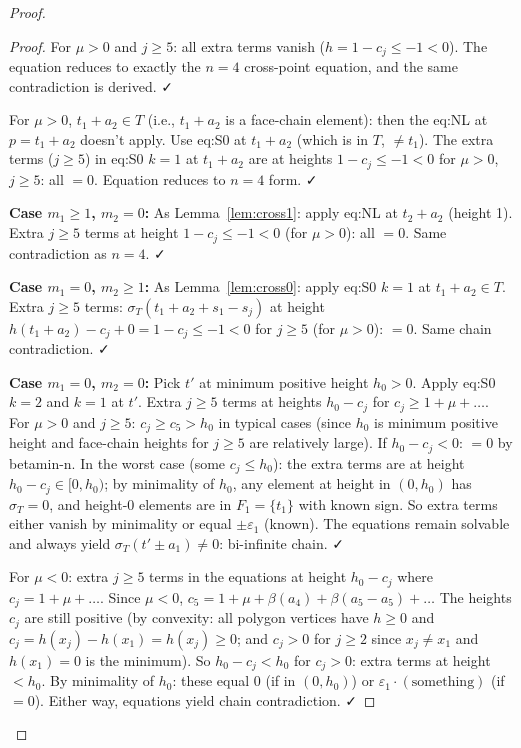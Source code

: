 \begin{proof}
\begin{proof}
For $\mu>0$ and $j\geq 5$: all extra terms vanish ($h=1-c_j\leq -1<0$). The equation reduces to exactly the $n=4$ cross-point equation, and the same contradiction is derived. ✓

For $\mu>0$, $t_1+a_2\in T$ (i.e., $t_1+a_2$ is a face-chain element): then the eq:NL at $p=t_1+a_2$ doesn't apply. Use eq:S0 at $t_1+a_2$ (which is in $T$, $\neq t_1$). The extra terms ($j\geq 5$) in eq:S0 $k=1$ at $t_1+a_2$ are at heights $1-c_j\leq -1<0$ for $\mu>0$, $j\geq 5$: all $=0$. Equation reduces to $n=4$ form. ✓

\textbf{Case $m_1\geq 1$, $m_2=0$:} As Lemma~\ref{lem:cross1}: apply eq:NL at $t_2+a_2$ (height 1). Extra $j\geq 5$ terms at height $1-c_j\leq -1<0$ (for $\mu>0$): all $=0$. Same contradiction as $n=4$. ✓

\textbf{Case $m_1=0$, $m_2\geq 1$:} As Lemma~\ref{lem:cross0}: apply eq:S0 $k=1$ at $t_1+a_2\in T$. Extra $j\geq 5$ terms: $\sigma_T(t_1+a_2+s_1-s_j)$ at height $h(t_1+a_2)-c_j+0 = 1-c_j\leq -1<0$ for $j\geq 5$ (for $\mu>0$): $=0$. Same chain contradiction. ✓

\textbf{Case $m_1=0$, $m_2=0$:} Pick $t'$ at minimum positive height $h_0>0$. Apply eq:S0 $k=2$ and $k=1$ at $t'$. Extra $j\geq 5$ terms at heights $h_0-c_j$ for $c_j\geq 1+\mu+\ldots$. For $\mu>0$ and $j\geq 5$: $c_j\geq c_5>h_0$ in typical cases (since $h_0$ is minimum positive height and face-chain heights for $j\geq 5$ are relatively large). If $h_0-c_j<0$: $=0$ by betamin-n. In the worst case (some $c_j\leq h_0$): the extra terms are at height $h_0-c_j\in[0,h_0)$; by minimality of $h_0$, any element at height in $(0,h_0)$ has $\sigma_T=0$, and height-0 elements are in $F_1=\{t_1\}$ with known sign. So extra terms either vanish by minimality or equal $\pm\varepsilon_1$ (known). The equations remain solvable and always yield $\sigma_T(t'\pm a_1)\neq 0$: bi-infinite chain. ✓

For $\mu<0$: extra $j\geq 5$ terms in the equations at height $h_0-c_j$ where $c_j=1+\mu+\ldots$. Since $\mu<0$, $c_5=1+\mu+\beta(a_4)+\beta(a_5-a_5)+\ldots$ The heights $c_j$ are still positive (by convexity: all polygon vertices have $h\geq 0$ and $c_j=h(x_j)-h(x_1)=h(x_j)\geq 0$; and $c_j>0$ for $j\geq 2$ since $x_j\neq x_1$ and $h(x_1)=0$ is the minimum). So $h_0-c_j<h_0$ for $c_j>0$: extra terms at height $<h_0$. By minimality of $h_0$: these equal $0$ (if in $(0,h_0)$) or $\varepsilon_1\cdot(\text{something})$ (if $=0$). Either way, equations yield chain contradiction. ✓

\medskip


\end{proof}
\end{proof}
